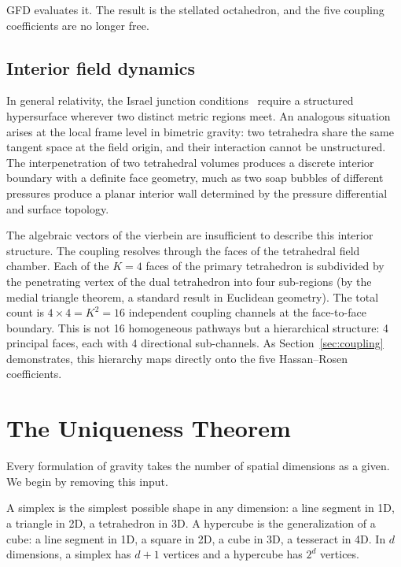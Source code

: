 \documentclass[twocolumn]{iopjournal}
\begin{document}
GFD evaluates it. The result is the stellated octahedron, and the five coupling coefficients are no longer free.

\subsection{Interior field dynamics}

In general relativity, the Israel junction conditions~\cite{Israel1966} require a structured hypersurface wherever two distinct metric regions meet. An analogous situation arises at the local frame level in bimetric gravity: two tetrahedra share the same tangent space at the field origin, and their interaction cannot be unstructured. The interpenetration of two tetrahedral volumes produces a discrete interior boundary with a definite face geometry, much as two soap bubbles of different pressures produce a planar interior wall determined by the pressure differential and surface topology.

The algebraic vectors of the vierbein are insufficient to describe this interior structure. The coupling resolves through the faces of the tetrahedral field chamber. Each of the $K = 4$ faces of the primary tetrahedron is subdivided by the penetrating vertex of the dual tetrahedron into four sub-regions (by the medial triangle theorem, a standard result in Euclidean geometry). The total count is $4 \times 4 = K^2 = 16$ independent coupling channels at the face-to-face boundary. This is not 16 homogeneous pathways but a hierarchical structure: 4 principal faces, each with 4 directional sub-channels. As Section~\ref{sec:coupling} demonstrates, this hierarchy maps directly onto the five Hassan--Rosen coefficients.


\section{The Uniqueness Theorem}
\label{sec:uniqueness}

Every formulation of gravity takes the number of spatial dimensions as a given. We begin by removing this input.

A simplex is the simplest possible shape in any dimension: a line segment in 1D, a triangle in 2D, a tetrahedron in 3D. A hypercube is the generalization of a cube: a line segment in 1D, a square in 2D, a cube in 3D, a tesseract in 4D. In $d$ dimensions, a simplex has $d+1$ vertices and a hypercube has $2^d$ vertices.
\end{document}

